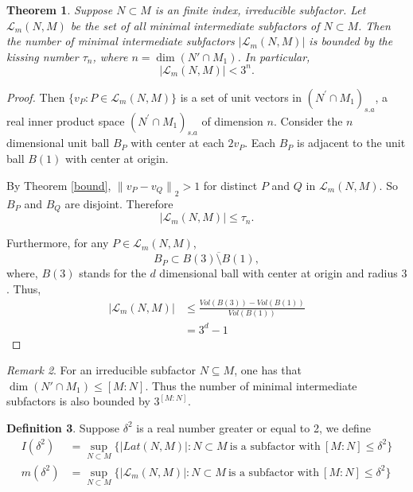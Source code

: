 \documentclass[11pt,letterpaper]{amsart}
\newtheorem{theorem}{Theorem}[section]
\theoremstyle{definition}
\newtheorem{definition}[theorem]{Definition}
\theoremstyle{remark}
\newtheorem{remark}[theorem]{Remark}
\begin{document}
\begin{theorem}\label{thm:minimal}
	Suppose $N\subset M$ is an finite index, irreducible subfactor. 
Let $\mathcal{L}_m(N,M)$ be the set of all minimal intermediate subfactors of $N\subset M$.
Then the number of minimal intermediate subfactors $|\mathcal{L}_m(N,M)|$ is bounded by the kissing number $\tau_n$, where $n=\dim (N' \cap M_1)$. In particular, 
$$|\mathcal{L}_m(N,M)| < 3^{n}.$$
\end{theorem}

\begin{proof}
Then $\{ v_P: P \in \mathcal{L}_m(N,M)\} $ is a set of unit vectors in $(N^\prime\cap M_1)_{s.a}$, a real inner product space $(N^\prime\cap M_1)_{s.a}$ of dimension $n$. 
Consider the $n$ dimensional unit ball $B_P$ with center at each $2v_P$. Each $B_P$ is adjacent to the unit ball $B(1)$ with center at origin.

By Theorem \ref{bound},  ${\lVert v_P-v_Q\rVert}_2 > 1$ for distinct $P$ and $Q$ in $\mathcal{L}_m(N,M)$. 
So $B_P$ and $B_Q$ are disjoint. Therefore 
$$|\mathcal{L}_m(N,M)|\leq \tau_n.$$

Furthermore, for any $P\in \mathcal{L}_m(N,M)$,
	\begin{equation*}
	B_P\subset \overline{B(3)\setminus B(1)},
	\end{equation*}
where, $B(3)$ stands for the $d$ dimensional ball with center at origin and radius $3$.
	Thus,
	\begin{align*}
	\vert \mathcal{L}_m(N,M)\vert&\leq \displaystyle\frac{Vol(B(3))-Vol(B(1))}{Vol(B(1))}\\
	&=3^d-1
	\end{align*}
\end{proof}

\begin{remark}
For an irreducible subfactor $N\subseteq M$, one has that $\dim (N' \cap M_1)\leq [M:N]$. Thus the number of minimal intermediate subfactors is also bounded by $3^{[M:N]}$.
 \end{remark}



\begin{definition}
	Suppose $\delta^2$ is a real number greater or equal to 2, we define
	\begin{align*}
	I(\delta^2)&=\sup_{N\subset  M}\{\vert Lat(N,M)\vert:N\subset M ~\textrm{is a subfactor with}~[M:N]\leq \delta^2\}\\
	m(\delta^2)&=\sup_{N\subset M}\{\vert \mathcal{L}_m(N,M)\vert:N\subset M ~\textrm{is a subfactor with}~[M:N]\leq \delta^2\}
	\end{align*}
	
\end{definition}
\end{document}
